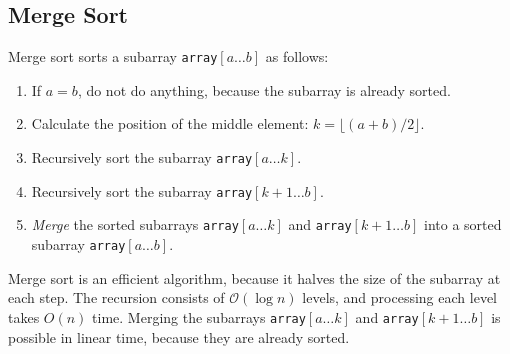 \documentclass[twoside,12pt,a4paper,english]{book}
\theoremstyle{definition}
\theoremstyle{problemstyle}
\begin{document}
\subsection{Merge Sort}
Merge sort sorts a subarray \texttt{array}$[a \ldots b]$ as follows:

\begin{enumerate}
\item If $a=b$, do not do anything, because the subarray is already sorted.
\item Calculate the position of the middle element: $k=\lfloor (a+b)/2 \rfloor$.
\item Recursively sort the subarray \texttt{array}$[a \ldots k]$.
\item Recursively sort the subarray \texttt{array}$[k+1 \ldots b]$.
\item \emph{Merge} the sorted subarrays \texttt{array}$[a \ldots k]$ and
\texttt{array}$[k+1 \ldots b]$
into a sorted subarray \texttt{array}$[a \ldots b]$.
\end{enumerate}

Merge sort is an efficient algorithm, because it
halves the size of the subarray at each step.
The recursion consists of $\mathcal{O}(\log n)$ levels,
and processing each level takes $O(n)$ time.
Merging the subarrays \texttt{array}$[a \ldots k]$ and \texttt{array}$[k+1 \ldots b]$
is possible in linear time, because they are already sorted.
\end{document}
